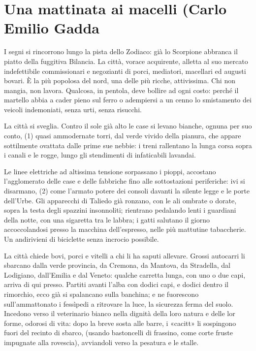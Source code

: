 \section*{Una mattinata ai macelli (Carlo Emilio Gadda}
I segni si rincorrono lungo la pista dello Zodiaco: già lo Scorpione abbranca il piatto della fuggitiva Bilancia. La città, vorace acquirente, alletta al suo mercato indefettibile commissionari e negozianti di porci, mediatori, macellari ed augusti bovari. È la più popolosa del nord, una delle più ricche, attivissima. Chi non mangia, non lavora. Qualcosa, in pentola, deve bollire ad ogni costo: perché il martello abbia a cader pieno sul ferro o adempiersi a un cenno lo smistamento dei veicoli indemoniati, senza urti, senza risucchi.

La città si sveglia. Contro il sole già alto le case si levano bianche, ognuna per suo conto, (1) quasi ammodernate torri, dal verde vivido della pianura, che appare sottilmente ovattata dalle prime sue nebbie: i treni rallentano la lunga corsa sopra i canali e le rogge, lungo gli stendimenti di infaticabili lavandai.

Le linee elettriche ad altissima tensione sorpassano i pioppi, accostano l’agglomerato delle case e delle fabbriche fino alle sottostazioni periferiche: ivi si disarmano, (2) come l’armato potere dei consoli davanti la silente legge e le porte dell’Urbe. Gli apparecchi di Taliedo già ronzano, con le ali ombrate o dorate, sopra la testa degli spazzini insonnoliti; rientrano pedalando lenti i guardiani della notte, con una sigaretta tra le labbra; i gatti salutano il giorno accoccolandosi presso la macchina dell’espresso, nelle più mattutine tabaccherie. Un andirivieni di biciclette senza incrocio possibile.

La città chiede bovi, porci e vitelli a chi li ha saputi allevare. Grossi autocarri li sbarcano dalla verde provincia, da Cremona, da Mantova, da Stradella, dal Lodigiano, dall’Emilia e dal Veneto: qualche carretta lunga, con uno o due capi, arriva di qui presso. Partiti avanti l’alba con dodici capi, e dodici dentro il rimorchio, ecco già si spalancano sulla banchina; e ne fuorescono sull’ammattonato i fessìpedi a ritrovare la luce, la sicurezza ferma del suolo. Incedono verso il veterinario bianco nella dignità della loro natura e delle lor forme, odorosi di vita: dopo la breve sosta alle barre, i «cacitt» li sospingono fuori del recinto di sbarco, (usando bastoncelli di frassino, come corte fruste impugnate alla rovescia), avviandoli verso la pesatura e le stalle.

